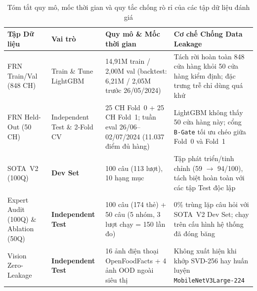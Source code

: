 \begin{table}[H]
\centering
\caption{Tóm tắt quy mô, mốc thời gian và quy tắc chống rò rỉ của các tập dữ liệu đánh giá}
\label{tab:split_protocol}
\footnotesize
\begin{tabularx}{\textwidth}{L{2.8cm} L{2.4cm} L{3.6cm} Y}
\toprule
\textbf{Tập Dữ liệu} & \textbf{Vai trò} & \textbf{Quy mô \& Mốc thời gian} & \textbf{Cơ chế Chống Data Leakage} \\
\midrule
FRN Train/Val (848 CH) & Train \& Tune LightGBM & 14,91M train / 2,00M val (backtest: 6,21M / 2,05M trước 26/05/2024) & Tách rời hoàn toàn 848 cửa hàng khỏi 50 cửa hàng kiểm định; đặc trưng trễ chỉ dùng quá khứ \\
FRN Held-Out (50 CH) & Independent Test \& 2-Fold CV & 25 CH Fold~0 + 25 CH Fold~1; tuần eval 26/06--02/07/2024 (11.037 điểm đủ hàng) & LightGBM không thấy 50 cửa hàng này; cổng \texttt{B-Gate} tối ưu chéo giữa Fold~0 và Fold~1 \\
SOTA~V2 (100Q) & \textbf{Dev Set} & 100 câu (113 lượt), 10 hạng mục & Tập phát triển/tinh chỉnh (59 $\to$ 94/100), tách biệt hoàn toàn với các tập Test độc lập \\
Expert Audit (100Q) \& Ablation (50Q) & \textbf{Independent Test} & 100 câu (174 thẻ) + 50 câu (5 nhóm, 3 lượt chạy = 150 lần đo) & 0\% trùng lặp câu hỏi với SOTA~V2 Dev Set; chạy trên cấu hình hệ thống đã đóng băng \\
Vision Zero-Leakage & \textbf{Independent Test} & 16 ảnh điện thoại OpenFoodFacts + 4 ảnh OOD ngoài siêu thị & Không xuất hiện khi khớp SVD-256 hay huấn luyện \texttt{MobileNetV3Large-224} \\
\bottomrule
\end{tabularx}
\end{table}
